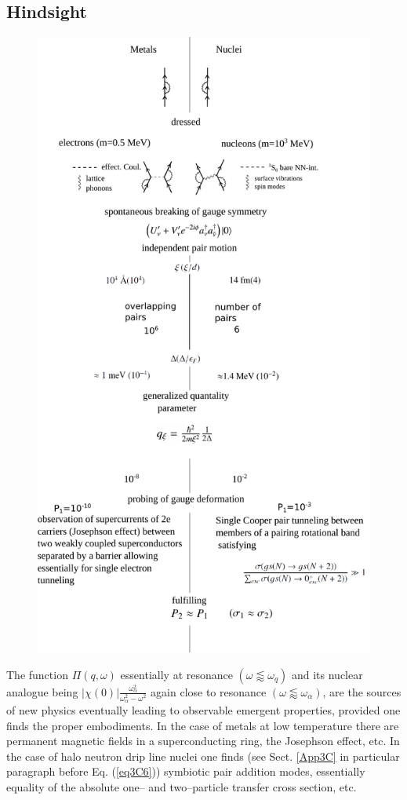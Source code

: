 \begin{subappendices}
\subsection{Hindsight}
         \begin{figure}
         	\centerline{\includegraphics*[width=13cm,angle=0	]{nutshell/figs/fig3B4x}}
         	\caption{}\label{fig3B4x}
         \end{figure}
The function $\Pi(q,\omega)$ essentially at resonance $(\omega\lessapprox\omega_q)$ and its nuclear analogue being $|\chi(0)|\frac{\omega_\alpha^2}{\omega_\alpha^2-\omega^2}$ again close to resonance $(\omega\lessapprox\omega_\alpha)$, are the sources of new physics eventually leading to observable emergent properties, provided one finds the  proper embodiments. In the case of metals at low temperature there are permanent magnetic fields in a superconducting ring, the Josephson effect, etc. In the case of halo neutron drip line nuclei one finds (see Sect. \ref{App3C} in particular paragraph before Eq. (\ref{eq3C6})) symbiotic pair addition modes, essentially equality of the absolute one-- and two--particle transfer cross section, etc. 



\end{subappendices}
